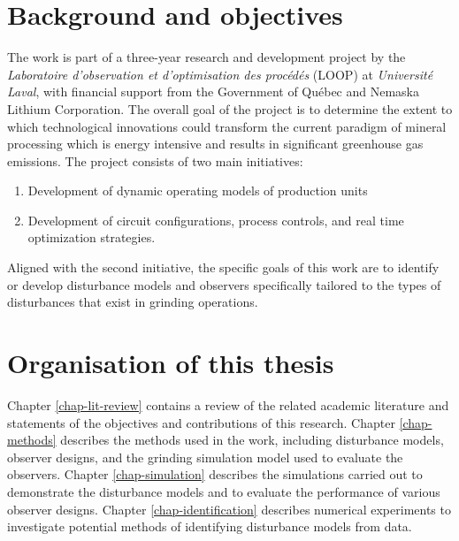 \section*{Background and objectives}

The work is part of a three-year research and development project by the \textit{Laboratoire d’observation et d’optimisation des procédés} (LOOP) at \textit{Universit\'e Laval}, with financial support from the Government of Qu\'ebec and Nemaska Lithium Corporation. The overall goal of the project is to determine the extent to which technological innovations could transform the current paradigm of mineral processing which is energy intensive and results in significant greenhouse gas emissions. The project consists of two main initiatives:

\begin{enumerate}
	\item Development of dynamic operating models of production units
	\item Development of circuit configurations, process controls, and real time optimization strategies.
\end{enumerate}

Aligned with the second initiative, the specific goals of this work are to identify or develop disturbance models and observers specifically tailored to the types of disturbances that exist in grinding operations.

\section*{Organisation of this thesis}

Chapter \ref{chap-lit-review} contains a review of the related academic literature and statements of the objectives and contributions of this research. Chapter \ref{chap-methods} describes the methods used in the work, including disturbance models, observer designs, and the grinding simulation model used to evaluate the observers. Chapter \ref{chap-simulation} describes the simulations carried out to demonstrate the disturbance models and to evaluate the performance of various observer designs. Chapter \ref{chap-identification} describes numerical experiments to investigate potential methods of identifying disturbance models from data.
